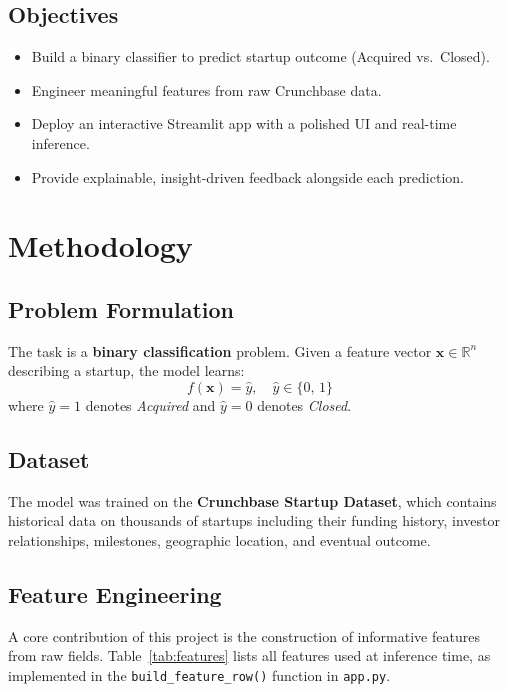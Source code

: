 \documentclass[12pt,a4paper]{article}
\begin{document}
\subsection{Objectives}
\begin{itemize}[leftmargin=1.5em]
    \item Build a binary classifier to predict startup outcome (Acquired vs.\ Closed).
    \item Engineer meaningful features from raw Crunchbase data.
    \item Deploy an interactive Streamlit app with a polished UI and real-time inference.
    \item Provide explainable, insight-driven feedback alongside each prediction.
\end{itemize}

\section{Methodology}

\subsection{Problem Formulation}

The task is a \textbf{binary classification} problem. Given a feature vector
$\mathbf{x} \in \mathbb{R}^n$ describing a startup, the model learns:
\[
    f(\mathbf{x}) = \hat{y}, \quad \hat{y} \in \{0,\, 1\}
\]
where $\hat{y} = 1$ denotes \textit{Acquired} and $\hat{y} = 0$ denotes
\textit{Closed}.

\subsection{Dataset}

The model was trained on the \textbf{Crunchbase Startup Dataset}, which contains
historical data on thousands of startups including their funding history, investor
relationships, milestones, geographic location, and eventual outcome.

\subsection{Feature Engineering}

A core contribution of this project is the construction of informative features
from raw fields. Table~\ref{tab:features} lists all features used at inference
time, as implemented in the \texttt{build\_feature\_row()} function in
\texttt{app.py}.
\end{document}
